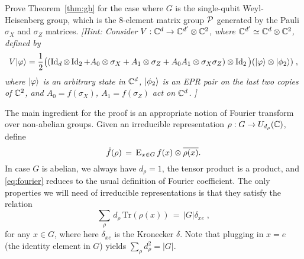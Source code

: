 \begin{exercise}\label{ex:gh-pauli}
Prove Theorem~\ref{thm:gh} for the case where $G$ is the single-qubit Weyl-Heisenberg group, which is the $8$-element matrix group $\mathcal{P}$ generated by the Pauli $\sigma_X$ and $\sigma_Z$ matrices. \emph{[Hint: Consider $V:\mathbb{C}^d \to \mathbb{C}^{d'} \otimes \mathbb{C}^2$, where $\mathbb{C}^{d'} \simeq \mathbb{C}^d \otimes \mathbb{C}^2 $, defined by 
$$V|\varphi\rangle = \frac{1}{2}\big((\mathop{\rm Id}\nolimits_d\otimes \mathop{\rm Id}\nolimits_2 + A_0 \otimes \sigma_X + A_1 \otimes \sigma_Z + A_0A_1 \otimes \sigma_X\sigma_Z)\otimes \mathop{\rm Id}\nolimits_2 \big)(|\varphi\rangle \otimes |\phi_2\rangle)\;,$$
where $|\varphi\rangle$ is an arbitrary state in $\mathbb{C}^d$, $|\phi_2\rangle$ is an EPR pair on the last two copies of $\mathbb{C}^2$, and $A_0=f(\sigma_X)$, $A_1=f(\sigma_Z)$ act on $\mathbb{C}^d$. 
 ]}
\end{exercise}

The main ingredient for the proof is an appropriate notion of Fourier transform over non-abelian groups. Given an irreducible representation $\rho: G \to U_{d_\rho}(\mathbb{C})$, define 
\begin{equation}\label{eq:fourier}
 \hat{f}(\rho) \,=\, \textsc{E}_{x\in G} \,f(x) \otimes \overline{\rho(x)}.
\end{equation}
In case $G$ is abelian, we always have $d_\rho=1$, the tensor product is a product, and \eqref{eq:fourier} reduces to the usual definition of Fourier coefficient. The only properties we will need of irreducible representations is that they satisfy the relation
\begin{equation}\label{eq:ortho}
\sum_\rho \,d_\rho\,\mathrm{Tr}(\rho(x)) \,=\, |G|\delta_{xe}\;,
\end{equation}
for any $x\in G$, where here $\delta_{xe}$ is the Kronecker $\delta$. Note that plugging in $x=e$ (the identity element in $G$) yields $\sum_\rho d_\rho^2= |G|$. 

